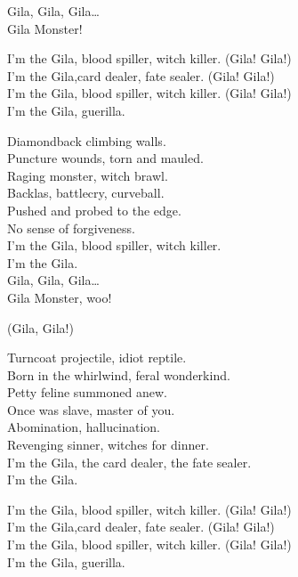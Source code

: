 Gila, Gila, Gila… \\
Gila Monster! \\


I'm the Gila, blood spiller, witch killer. (Gila! Gila!) \\
I'm the Gila,card dealer, fate sealer. (Gila! Gila!) \\
I'm the Gila, blood spiller, witch killer. (Gila! Gila!) \\
I'm the Gila,  guerilla. \\


Diamondback climbing walls. \\
Puncture wounds, torn and mauled. \\
Raging monster, witch brawl. \\
Backlas, battlecry, curveball. \\
Pushed and probed to the edge. \\
No sense of forgiveness. \\
I'm the Gila, blood spiller, witch killer. \\
I'm the Gila. \\

Gila, Gila, Gila… \\
Gila Monster, woo! \\


(Gila, Gila!)


Turncoat projectile, idiot reptile. \\
Born in the whirlwind, feral wonderkind. \\
Petty feline summoned anew. \\
Once was slave, master of you. \\
Abomination, hallucination. \\
Revenging sinner, witches for dinner. \\
I'm the Gila, the card dealer, the fate sealer. \\
I'm the Gila. \\


I'm the Gila, blood spiller, witch killer. (Gila! Gila!) \\
I'm the Gila,card dealer, fate sealer. (Gila! Gila!) \\
I'm the Gila, blood spiller, witch killer. (Gila! Gila!) \\
I'm the Gila,  guerilla. \\

